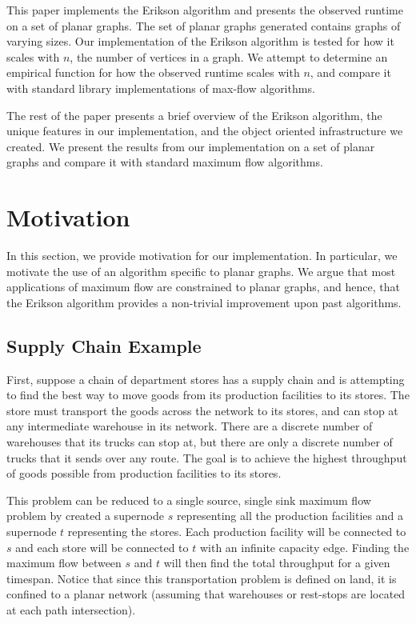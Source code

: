 \documentclass[12pt]{article}
\begin{document}
This paper implements the Erikson algorithm and presents the observed runtime on a set of planar graphs. The set of planar graphs generated contains graphs of varying sizes. Our implementation of the Erikson algorithm is tested for how it scales with $n$, the number of vertices in a graph. We attempt to determine an empirical function for how the observed runtime scales with $n$, and compare it with standard library implementations of max-flow algorithms.

The rest of the paper presents a brief overview of the Erikson algorithm, the unique features in our implementation, and the object oriented infrastructure we created. We present the results from our implementation on a set of planar graphs and compare it with standard maximum flow algorithms.

\section{Motivation}

In this section, we provide motivation for our implementation. In particular, we motivate the use of an algorithm specific to planar graphs. We argue that most applications of maximum flow are constrained to planar graphs, and hence, that the Erikson algorithm provides a non-trivial improvement upon past algorithms. 

\subsection{Supply Chain Example}

First, suppose a chain of department stores has a supply chain and is attempting to find the best way to move goods from its production facilities to its stores. The store must transport the goods across the network to its stores, and can stop at any intermediate warehouse in its network. There are a discrete number of warehouses that its trucks can stop at, but there are only a discrete number of trucks that it sends over any route. The goal is to achieve the highest throughput of goods possible from production facilities to its stores.

This problem can be reduced to a single source, single sink maximum flow problem by created a supernode $s$ representing all the production facilities and a supernode $t$ representing the stores. Each production facility will be connected to $s$ and each store will be connected to $t$ with an infinite capacity edge. Finding the maximum flow between $s$ and $t$ will then find the total throughput for a given timespan. Notice that since this transportation problem is defined on land, it is confined to a planar network (assuming that warehouses or rest-stops are located at each path intersection). 
\end{document}
